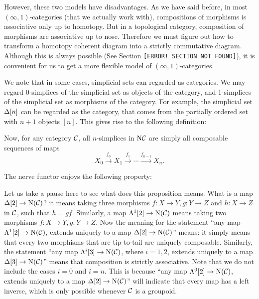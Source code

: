 However, these two models have disadvantages. As we have said before, in most $(\infty,1)$-categories (that we actually work with), compositions
of morphisms is associative only up to homotopy. But in a topological category, composition of morphisms are associative up to nose. 
Therefore we must figure out how to transform a homotopy coherent diagram into a strictly commutative diagram. Although this is always
possible (See Section {\color{red}\texttt{[ERROR! SECTION NOT FOUND]}}), it is convenient for us to get a more flexible model 
of $(\infty,1)$-categories.

We note that in some cases, simplicial sets can regarded as categories. We may regard 0-simplices of the simplicial set as objects of the category,
and 1-simplices of the simplicial set as morphisms of the category. For example, the simplicial set $\Delta[n]$ can be regarded as the category, 
that comes from the partially ordered set with $n+1$ objects $[n]$. This gives rise to the following definition:


Now, for any category $\mathcal{C}$, all $n$-simplices in $\mathrm{N}\mathcal{C}$ are simply all composable sequences of maps 
$$X_0\xrightarrow{f_0}X_1\xrightarrow{f_1}\cdots\xrightarrow{f_{n-1}}X_n.$$

The nerve functor enjoys the following property:


Let us take a pause here to see what does this proposition means. What is a map $\Delta[2]\to \mathrm{N}(\mathcal{C})$? it means taking three morphisms
$f:X\to Y,g:Y\to Z$ and $h:X\to Z$ in $\mathcal{C}$, such that $h=gf$. Similarly, a map $\Lambda^1[2]\to \mathrm{N}(\mathcal{C})$ means taking two morphisms 
$f:X\to Y,g:Y\to Z$. Now the meaning for the statement ``any map $\Lambda^1[2]\to \mathrm{N}(\mathcal{C})$, extends uniquely to a map $\Delta[2]\to \mathrm{N}(\mathcal{C})$'' means: 
it simply means that every two morphisms that are tip-to-tail are uniquely composable. Similarly, the statement ``any map $\Lambda^i[3]\to \mathrm{N}(\mathcal{C})$,
where $i=1,2$, extends uniquely to a map $\Delta[3]\to \mathrm{N}(\mathcal{C})$'' means that composition is strictly associative. Note that we do not
include the cases $i=0$ and $i=n$. This is because ``any map $\Lambda^0[2]\to \mathrm{N}(\mathcal{C})$, extends uniquely to a map $\Delta[2]\to \mathrm{N}(\mathcal{C})$''
will indicate that every map has a left inverse, which is only possible whenever $\mathcal{C}$ is a groupoid.

